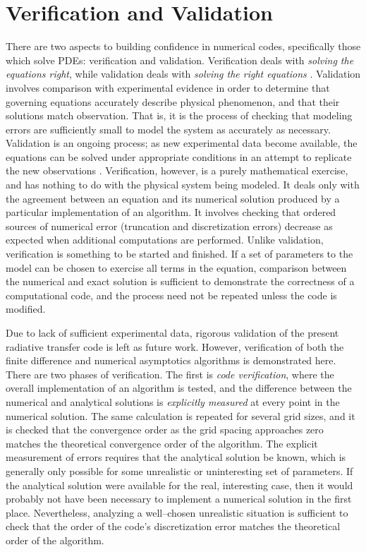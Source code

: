 \section{Verification and Validation}
\label{sec:v2}
There are two aspects to building confidence in numerical codes, specifically those which solve PDEs: verification and validation.
Verification deals with \textit{solving the equations right}, while validation deals with \textit{solving the right equations} \cite{roache_verification_1998}.
Validation involves comparison with experimental evidence in order to determine that governing equations
accurately describe physical phenomenon, and that their solutions match observation.
That is, it is the process of checking that modeling errors are sufficiently small to model the system as accurately as necessary.
Validation is an ongoing process; as new experimental data become available, the equations can be solved under appropriate conditions in an attempt to replicate the new observations \cite{roache_building_2004}.
Verification, however, is a purely mathematical exercise, and has nothing to do with the physical system being modeled.
It deals only with the agreement between an equation and its numerical solution produced by a particular implementation of an algorithm.
It involves checking that ordered sources of numerical error (truncation and discretization errors) decrease as expected when additional computations are performed.
Unlike validation, verification is something to be started and finished.
If a set of parameters to the model can be chosen to exercise all terms in the equation, comparison between the numerical and exact solution is sufficient to demonstrate the correctness of a computational code, and the process need not be repeated unless the code is modified.

Due to lack of sufficient experimental data, rigorous validation of the present radiative transfer code is left as future work.
However, verification of both the finite difference and numerical asymptotics algorithms is demonstrated here.
There are two phases of verification.
The first is \textit{code verification}, where the overall implementation of an algorithm is tested, and the difference between the numerical and analytical solutions is \textit{explicitly measured} at every point in the numerical solution.
The same calculation is repeated for several grid sizes, and it is checked that the convergence order as the grid spacing approaches zero matches the theoretical convergence order of the algorithm.
The explicit measurement of errors requires that the analytical solution be known, which is generally only possible for some unrealistic or uninteresting set of parameters.
If the analytical solution were available for the real, interesting case, then it would probably not have been necessary to implement a numerical solution in the first place.
Nevertheless, analyzing a well--chosen unrealistic situation is sufficient to check that the order of the code's discretization error matches the theoretical order of the algorithm.

